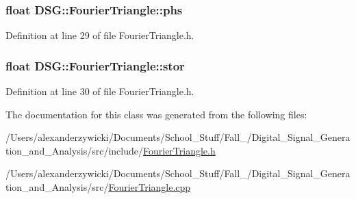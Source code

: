 \hypertarget{classDSG_1_1FourierTriangle_a6a934e1f4271a9b4984fef83a51a0d74}{
\subsubsection[{phs}]{\setlength{\rightskip}{0pt plus 5cm}float D\+S\+G\+::\+Fourier\+Triangle\+::phs\hspace{0.3cm}{\ttfamily [protected]}}}\label{classDSG_1_1FourierTriangle_a6a934e1f4271a9b4984fef83a51a0d74}


Definition at line 29 of file Fourier\+Triangle.\+h.

\hypertarget{classDSG_1_1FourierTriangle_af34da414548a924ff49e49e4ba6353d4}{
\subsubsection[{stor}]{\setlength{\rightskip}{0pt plus 5cm}float D\+S\+G\+::\+Fourier\+Triangle\+::stor\hspace{0.3cm}{\ttfamily [protected]}}}\label{classDSG_1_1FourierTriangle_af34da414548a924ff49e49e4ba6353d4}


Definition at line 30 of file Fourier\+Triangle.\+h.



The documentation for this class was generated from the following files\+:\begin{DoxyCompactItemize}
\item 
/\+Users/alexanderzywicki/\+Documents/\+School\+\_\+\+Stuff/\+Fall\+\_/\+Digital\+\_\+\+Signal\+\_\+\+Generation\+\_\+and\+\_\+\+Analysis/src/include/\hyperlink{FourierTriangle_8h}{Fourier\+Triangle.\+h}\item 
/\+Users/alexanderzywicki/\+Documents/\+School\+\_\+\+Stuff/\+Fall\+\_/\+Digital\+\_\+\+Signal\+\_\+\+Generation\+\_\+and\+\_\+\+Analysis/src/\hyperlink{FourierTriangle_8cpp}{Fourier\+Triangle.\+cpp}\end{DoxyCompactItemize}
